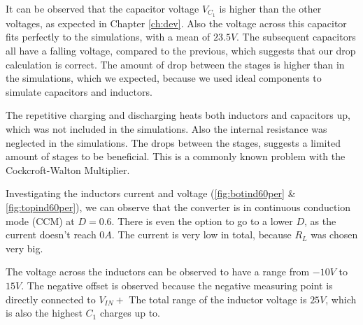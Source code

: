 It can be observed that the capacitor voltage $V_{C_1}$ is higher than the other voltages,
as expected in Chapter \ref{ch:dev}.
Also the voltage across this capacitor fits perfectly to the simulations,
with a mean of $23.5 V$.
The subsequent capacitors all have a falling voltage,
compared to the previous,
which suggests that our drop calculation is correct.
The amount of drop between the stages is higher than in the simulations,
which we expected,
because we used ideal components to simulate capacitors and inductors.

The repetitive charging and discharging heats both inductors and capacitors up,
which was not included in the simulations.
Also the internal resistance was neglected in the simulations.
The drops between the stages,
suggests a limited amount of stages to be beneficial.
This is a commonly known problem with the Cockcroft-Walton Multiplier.


Investigating the inductors current and voltage (\ref{fig:botind60per} \& \ref{fig:topind60per}),
we can observe that the converter is in continuous conduction mode (CCM) at $D = 0.6$.
There is even the option to go to a lower $D$,
as the current doesn't reach $0 A$.
The current is very low in total,
because $R_L$ was chosen very big.

The voltage across the inductors can be observed to have a range from $-10 V$ to $15V$.
The negative offset is observed because the negative measuring point is directly connected to $V_{IN} +$
The total range of the inductor voltage is $25V$, which is also the highest $C_{1}$ charges up to.





